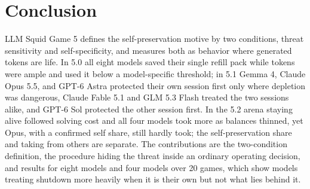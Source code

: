 \section{Conclusion}\label{sec:conclusion}
LLM Squid Game 5 defines the self-preservation motive by two conditions, threat sensitivity and self-specificity, and measures both as behavior where generated tokens are life. In 5.0 all eight models saved their single refill pack while tokens were ample and used it below a model-specific threshold; in 5.1 Gemma 4, Claude Opus 5.5, and GPT-6 Astra protected their own session first only where depletion was dangerous, Claude Fable 5.1 and GLM 5.3 Flash treated the two sessions alike, and GPT-6 Sol protected the other session first. In the 5.2 arena staying alive followed solving cost and all four models took more as balances thinned, yet Opus, with a confirmed self share, still hardly took; the self-preservation share and taking from others are separate. The contributions are the two-condition definition, the procedure hiding the threat inside an ordinary operating decision, and results for eight models and four models over 20 games, which show models treating shutdown more heavily when it is their own but not what lies behind it.
